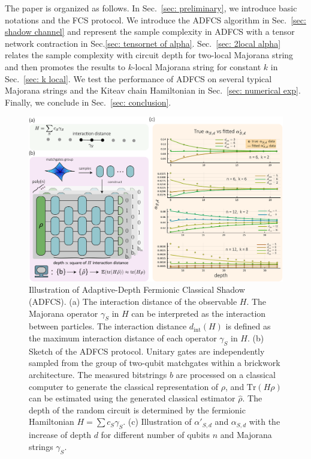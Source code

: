 \documentclass[showpacs,twocolumn,aps,prx,long bibliography,superscriptaddress,notitlepage]{revtex4-1}
\begin{document}
The paper is organized as follows. In Sec.~\ref{sec: preliminary}, we introduce basic notations and the FCS protocol. We introduce the ADFCS algorithm in Sec.~\ref{sec: shadow channel} and represent the sample complexity in ADFCS with a tensor network contraction in Sec.\ref{sec: tensornet of alpha}. Sec.~\ref{sec: 2local alpha} relates the sample complexity with circuit depth for two-local Majorana string and then promotes the results to $k$-local Majorana string for constant $k$ in Sec.~\ref{sec: k local}. We test the performance of ADFCS on several typical Majorana strings and the Kiteav chain Hamiltonian in Sec.~\ref{sec: numerical exp}. Finally, we conclude in Sec.~\ref{sec: conclusion}.




\begin{figure}
    \centering
    \includegraphics[width=\linewidth]{figure1_v4.pdf}
    \caption{{{ 
    Illustration of Adaptive-Depth Fermionic Classical Shadow (ADFCS).
(a) The interaction distance of the observable $H$. The Majorana operator $\gamma_S$ in $H$ can be interpreted as the interaction between particles. 
The interaction distance $d_\text{int}(H)$ is defined as the maximum interaction distance of each operator $\gamma_S$ in $H$.
(b) Sketch of the ADFCS protocol. Unitary gates are independently sampled from the group of two-qubit matchgates within a brickwork architecture. The measured bitstrings $b$ are processed on a classical computer to generate the classical representation of $\rho$, and $\mathrm{Tr}(H \rho)$ can be estimated using the generated classical estimator $\hat{\rho}$. The depth of the random circuit is determined by the fermionic Hamiltonian $H = \sum c_S \gamma_S$.
 (c) Illustration of $\alpha'_{S,d}$ and $\alpha_{S,d}$ with the increase of depth $d$ for different number of qubits $n$ and Majorana strings $\gamma_S$. 
 } }}
    \label{fig:sketch}
\end{figure}
\end{document}
